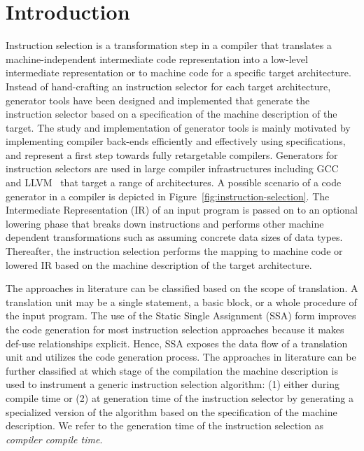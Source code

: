 \section{Introduction}

Instruction selection is a transformation step in a compiler that
translates a machine-independent intermediate code representation into
a low-level intermediate representation or to machine code for a
specific target architecture. Instead of hand-crafting an instruction
selector for each target architecture, generator tools have been
designed and implemented that generate the instruction selector based
on a specification of the machine description of the target. The study
and implementation of generator tools is mainly motivated by
implementing compiler back-ends efficiently and effectively using
specifications, and represent a first step towards fully retargetable
compilers. Generators for instruction
selectors are used in large compiler infrastructures including
GCC~\cite{wwwGCC} and LLVM~\cite{wwwLLVM} that target a range of
architectures.
A possible scenario of a code generator in a compiler is depicted in
Figure~\ref{fig:instruction-selection}. The Intermediate
Representation (IR) of an input program is passed on to an optional lowering phase that
breaks down instructions and performs other machine dependent
transformations such as assuming concrete data sizes of data
types. Thereafter, the instruction selection performs the mapping to machine code or
lowered IR based on the machine description of
the target architecture.

The approaches in literature can be classified based on the scope of
translation. A translation unit may be a single statement, a basic
block, or a whole procedure of the input program. The use of the
Static Single Assignment (SSA) form improves the code generation for
most instruction selection approaches because it makes def-use
relationships explicit. Hence, SSA exposes the data flow of a
translation unit and utilizes the code generation process.  The
approaches in literature can be further classified at which stage of
the compilation the machine description is used to instrument a
generic instruction selection algorithm: (1) either during compile
time or (2) at generation time of the instruction selector by
generating a specialized version of the algorithm based on the
specification of the machine description. We refer to the generation
time of the instruction selection as \emph{compiler compile time}.


